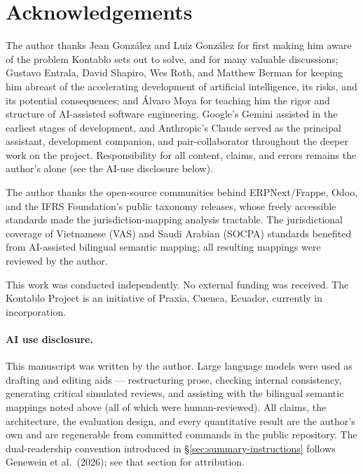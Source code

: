 \section*{Acknowledgements}

The author thanks Jean González and Luiz González for first making him aware of
the problem Kontablo sets out to solve, and for many valuable discussions;
Gustavo Entrala, David Shapiro, Wes Roth, and Matthew Berman for keeping him abreast of the
accelerating development of artificial intelligence, its risks, and its potential
consequences; and Álvaro Moya for teaching him the rigor and structure of
AI-assisted software engineering. Google's Gemini assisted in the earliest stages
of development, and Anthropic's Claude served as the principal assistant,
development companion, and pair-collaborator throughout the deeper work on the
project. Responsibility for all content, claims, and errors remains the author's
alone (see the AI-use disclosure below).

The author thanks the open-source communities behind ERPNext/Frappe, Odoo, and the IFRS Foundation's public taxonomy releases, whose freely accessible standards made the jurisdiction-mapping analysis tractable. The jurisdictional coverage of Vietnamese (VAS) and Saudi Arabian (SOCPA) standards benefited from AI-assisted bilingual semantic mapping; all resulting mappings were reviewed by the author.

This work was conducted independently. No external funding was received. The Kontablo Project is an initiative of Praxia, Cuenca, Ecuador, currently in incorporation.


\paragraph{AI use disclosure.} This manuscript was written by the author. Large
language models were used as drafting and editing aids --- restructuring prose,
checking internal consistency, generating critical simulated reviews, and
assisting with the bilingual semantic mappings noted above (all of which were
human-reviewed). All claims, the architecture, the evaluation design, and every
quantitative result are the author's own and are regenerable from committed
commands in the public repository. The dual-readership convention introduced
in \S\ref{sec:summary-instructions} follows Genewein et al.\ (2026); see that
section for attribution.
